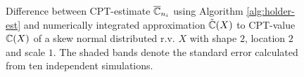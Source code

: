 \begin{figure}
    \centering
{}
			\caption{Difference between CPT-estimate $\overline {\mathbb{C}}_{n_i}$ using Algorithm \ref{alg:holder-est} and numerically integrated approximation $\tilde {\mathbb{C}}(X)$ to CPT-value $\mathbb{C}(X)$ of a skew normal distributed r.v. $X$ with shape $2$, location $2$ and scale $1$. The shaded bands denote the standard error calculated from ten independent simulations. }
      \label{fig:cpt-est} 
			\end{figure}
